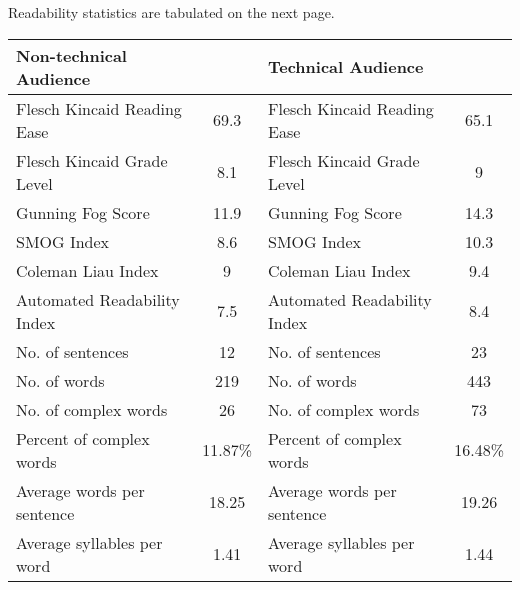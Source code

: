 \documentclass[11pt]{article}
\begin{document}
Readability statistics are tabulated on the next page.

\begin{tabular}{|l|c|l|c|}
\hline
Non-technical Audience          &           &
Technical Audience              &           \\
\hline
Flesch Kincaid Reading Ease     &   69.3    &
Flesch Kincaid Reading Ease     &   65.1    \\
\hline
Flesch Kincaid Grade Level      &   8.1     &
Flesch Kincaid Grade Level      &   9       \\
\hline
Gunning Fog Score               &   11.9    &
Gunning Fog Score               &   14.3    \\
\hline
SMOG Index                      &   8.6     &
SMOG Index                      &   10.3    \\
\hline
Coleman Liau Index              &   9       &
Coleman Liau Index              &   9.4     \\
\hline
Automated Readability Index     &   7.5     &
Automated Readability Index     &   8.4     \\
\hline
No. of sentences                &   12      &
No. of sentences                &   23      \\
\hline
No. of words                    &   219     &
No. of words                    &   443     \\
\hline
No. of complex words            &   26      &
No. of complex words            &   73      \\
\hline
Percent of complex words        &   11.87\% &
Percent of complex words        &   16.48\% \\
\hline
Average words per sentence      &   18.25   &
Average words per sentence      &   19.26   \\
\hline
Average syllables per word      &   1.41    &
Average syllables per word      &   1.44    \\
\hline
\end{tabular}
\end{document}
